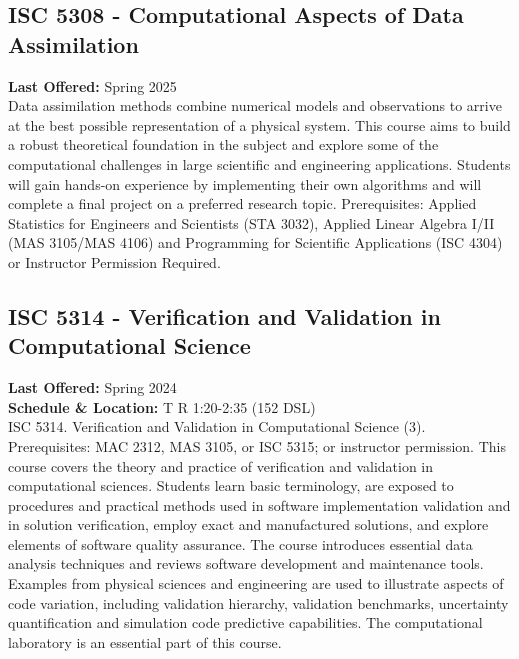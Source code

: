\documentclass[12pt,a4paper]{article}
\begin{document}
\subsection{ISC 5308 - Computational Aspects of Data Assimilation}
\textbf{Last Offered:} Spring 2025 \\
Data assimilation methods combine numerical models and observations to arrive at the best possible representation of a physical system. This course aims to build a robust theoretical foundation in the subject and explore some of the computational challenges in large scientific and engineering applications. Students will gain hands-on experience by implementing their own algorithms and will complete a final project on a preferred research topic. Prerequisites: Applied Statistics for Engineers and Scientists (STA 3032), Applied Linear Algebra I/II (MAS 3105/MAS 4106) and Programming for Scientific Applications (ISC 4304) or Instructor Permission Required.

\subsection{ISC 5314 - Verification and Validation in Computational Science}
\textbf{Last Offered:} Spring 2024 \\
\textbf{Schedule \& Location:} T R 1:20-2:35 (152 DSL) \\
ISC 5314. Verification and Validation in Computational Science (3). Prerequisites: MAC 2312, MAS 3105, or ISC 5315; or instructor permission. This course covers the theory and practice of verification and validation in computational sciences. Students learn basic terminology, are exposed to procedures and practical methods used in software implementation validation and in solution verification, employ exact and manufactured solutions, and explore elements of software quality assurance. The course introduces essential data analysis techniques and reviews software development and maintenance tools. Examples from physical sciences and engineering are used to illustrate aspects of code variation, including validation hierarchy, validation benchmarks, uncertainty quantification and simulation code predictive capabilities. The computational laboratory is an essential part of this course.
\end{document}
